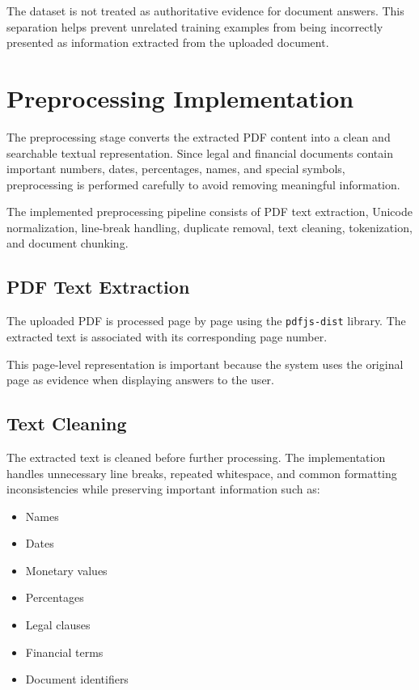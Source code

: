 The dataset is not treated as authoritative evidence for document
answers. This separation helps prevent unrelated training examples
from being incorrectly presented as information extracted from the
uploaded document.

\section{Preprocessing Implementation}

The preprocessing stage converts the extracted PDF content into a
clean and searchable textual representation. Since legal and financial
documents contain important numbers, dates, percentages, names, and
special symbols, preprocessing is performed carefully to avoid
removing meaningful information.

The implemented preprocessing pipeline consists of PDF text
extraction, Unicode normalization, line-break handling, duplicate
removal, text cleaning, tokenization, and document chunking.

\subsection{PDF Text Extraction}

The uploaded PDF is processed page by page using the
\texttt{pdfjs-dist} library. The extracted text is associated with its
corresponding page number.

This page-level representation is important because the system uses
the original page as evidence when displaying answers to the user.

\subsection{Text Cleaning}

The extracted text is cleaned before further processing. The
implementation handles unnecessary line breaks, repeated whitespace,
and common formatting inconsistencies while preserving important
information such as:

\begin{itemize}
    \item Names
    \item Dates
    \item Monetary values
    \item Percentages
    \item Legal clauses
    \item Financial terms
    \item Document identifiers
\end{itemize}

